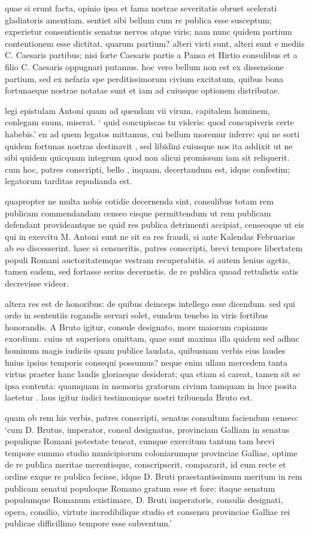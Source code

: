  quae si erunt facta, opinio ipsa et fama nostrae severitatis obruet scelerati gladiatoris amentiam. sentiet sibi bellum cum re publica esse susceptum; experietur consentientis senatus nervos atque viris; nam nunc quidem partium contentionem esse dictitat. quarum partium? alteri victi sunt, alteri sunt e mediis C. Caesaris partibus; nisi forte Caesaris partis a Pansa et Hirtio consulibus et a filio C. Caesaris oppugnari putamus. hoc vero bellum non est ex dissensione partium, sed ex nefaria spe perditissimorum civium excitatum, quibus bona fortunaeque nostrae notatae sunt et iam ad cuiusque optionem distributae.

 legi epistulam Antoni quam ad quendam vii virum, capitalem hominem, conlegam suum, miserat. ` quid concupiscas tu videris: quod concupiveris certe habebis.' en ad quem legatos mittamus, cui bellum moremur inferre: qui ne sorti quidem fortunas nostras destinavit , sed libidini cuiusque nos ita addixit ut ne sibi quidem quicquam integrum quod non alicui promissum iam sit reliquerit. cum hoc, patres conscripti, bello , inquam, decertandum est, idque confestim; legatorum tarditas repudianda est.

 quapropter ne multa nobis cotidie decernenda sint, consulibus totam rem publicam commendandam censeo eisque permittendum ut rem publicam defendant provideantque ne quid res publica detrimenti accipiat, censeoque ut eis qui in exercitu M. Antoni sunt ne sit ea res fraudi, si ante Kalendas Februarias ab eo discesserint. haec si censueritis, patres conscripti, brevi tempore libertatem populi Romani auctoritatemque vestram recuperabitis. si autem lenius agetis, tamen eadem, sed fortasse serius decernetis. de re publica quoad rettulistis satis decrevisse videor.

 altera res est de honoribus: de quibus deinceps intellego esse dicendum. sed qui ordo in sententiis rogandis servari solet, eundem tenebo in viris fortibus honorandis. A Bruto igitur, consule designato, more maiorum capiamus exordium. cuius ut superiora omittam, quae sunt maxima illa quidem sed adhuc hominum magis iudiciis quam publice laudata, quibusnam verbis eius laudes huius ipsius temporis consequi possumus? neque enim ullam mercedem tanta virtus praeter hanc laudis gloriaeque desiderat; qua etiam si careat, tamen sit se ipsa contenta: quamquam in memoria gratorum civium tamquam in luce posita laetetur . laus igitur iudici testimonique nostri tribuenda Bruto est.

 quam ob rem his verbis, patres conscripti, senatus consultum faciendum censeo: `cum D. Brutus, imperator, consul designatus, provinciam Galliam in senatus populique Romani potestate teneat, cumque exercitum tantum tam brevi tempore summo studio municipiorum coloniarumque provinciae Galliae, optime de re publica meritae merentisque, conscripserit, compararit, id eum recte et ordine exque re publica fecisse, idque D. Bruti praestantissimum meritum in rem publicam senatui populoque Romano gratum esse et fore: itaque senatum populumque Romanum existimare, D. Bruti imperatoris, consulis designati, opera, consilio, virtute incredibilique studio et consensu provinciae Galliae rei publicae difficillimo tempore esse subventum.'

